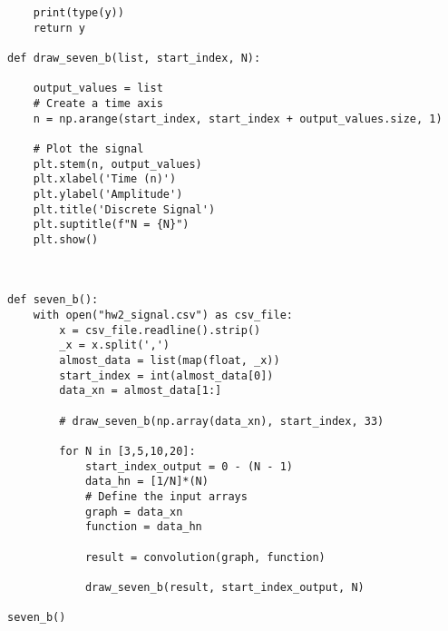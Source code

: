 \documentclass[10pt,a4paper, margin=1in]{article}
\begin{document}
\begin{enumerate}
\begin{enumerate}
\begin{verbatim}
    print(type(y))
    return y

def draw_seven_b(list, start_index, N):

    output_values = list
    # Create a time axis
    n = np.arange(start_index, start_index + output_values.size, 1)

    # Plot the signal
    plt.stem(n, output_values)
    plt.xlabel('Time (n)')
    plt.ylabel('Amplitude')
    plt.title('Discrete Signal')
    plt.suptitle(f"N = {N}")
    plt.show()



def seven_b():
    with open("hw2_signal.csv") as csv_file:
        x = csv_file.readline().strip()
        _x = x.split(',')
        almost_data = list(map(float, _x))
        start_index = int(almost_data[0])
        data_xn = almost_data[1:]

        # draw_seven_b(np.array(data_xn), start_index, 33)

        for N in [3,5,10,20]:
            start_index_output = 0 - (N - 1)
            data_hn = [1/N]*(N)
            # Define the input arrays
            graph = data_xn
            function = data_hn

            result = convolution(graph, function)

            draw_seven_b(result, start_index_output, N)

seven_b()

        \end{verbatim}


    \end{enumerate}    

\end{enumerate}
\end{document}
